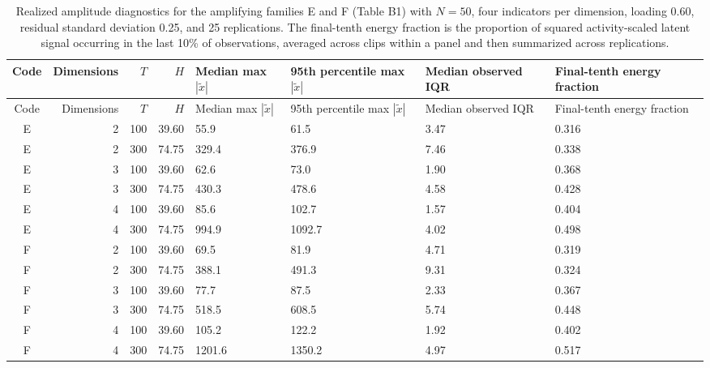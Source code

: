 \documentclass[
]{article}
\begin{document}
\begin{longtable}[t]{crrrp{0.85in}p{0.95in}p{0.85in}p{0.85in}}
\caption{Realized amplitude diagnostics for the amplifying families E and F (Table B1) with $N=50$, four indicators per dimension, loading 0.60, residual standard deviation 0.25, and 25 replications. The final-tenth energy fraction is the proportion of squared activity-scaled latent signal occurring in the last 10\% of observations, averaged across clips within a panel and then summarized across replications.}\\
\toprule
Code & Dimensions & $T$ & $H$ & Median max $|\tilde{x}|$ & 95th percentile max $|\tilde{x}|$ & Median observed IQR & Final-tenth energy fraction\\
\midrule
\endfirsthead
\toprule
Code & Dimensions & $T$ & $H$ & Median max $|\tilde{x}|$ & 95th percentile max $|\tilde{x}|$ & Median observed IQR & Final-tenth energy fraction\\
\midrule
\endhead
E & 2 & 100 & 39.60 & 55.9 & 61.5 & 3.47 & 0.316\\
E & 2 & 300 & 74.75 & 329.4 & 376.9 & 7.46 & 0.338\\
E & 3 & 100 & 39.60 & 62.6 & 73.0 & 1.90 & 0.368\\
E & 3 & 300 & 74.75 & 430.3 & 478.6 & 4.58 & 0.428\\
E & 4 & 100 & 39.60 & 85.6 & 102.7 & 1.57 & 0.404\\
\addlinespace
E & 4 & 300 & 74.75 & 994.9 & 1092.7 & 4.02 & 0.498\\
F & 2 & 100 & 39.60 & 69.5 & 81.9 & 4.71 & 0.319\\
F & 2 & 300 & 74.75 & 388.1 & 491.3 & 9.31 & 0.324\\
F & 3 & 100 & 39.60 & 77.7 & 87.5 & 2.33 & 0.367\\
F & 3 & 300 & 74.75 & 518.5 & 608.5 & 5.74 & 0.448\\
\addlinespace
F & 4 & 100 & 39.60 & 105.2 & 122.2 & 1.92 & 0.402\\
F & 4 & 300 & 74.75 & 1201.6 & 1350.2 & 4.97 & 0.517\\
\bottomrule
\end{longtable}
\endgroup
\end{document}
